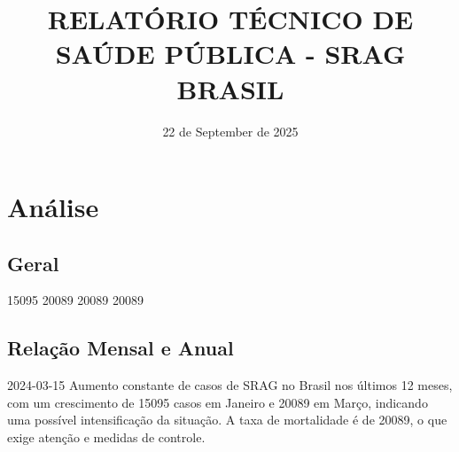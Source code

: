 \documentclass{article}%
\title{\textbf{RELATÓRIO TÉCNICO DE SAÚDE PÚBLICA - SRAG BRASIL}}%
\date{22 de September de 2025}%
\begin{document}
%
\normalsize%
\maketitle%
\section{Análise}%
\label{sec:Anlise}%
\subsection{Geral}%
\label{subsec:Geral}%
15095\newline%
%
20089\newline%
%
20089\newline%
%
20089\newline%

%
\subsection{Relação Mensal e Anual}%
\label{subsec:RelaoMensaleAnual}%
2024{-}03{-}15\newline%
%
Aumento constante de casos de SRAG no Brasil nos últimos 12 meses, com um crescimento de 15095 casos em Janeiro e 20089 em Março, indicando uma possível intensificação da situação. A taxa de mortalidade é de 20089, o que exige atenção e medidas de controle.\newline%
%
\end{document}
